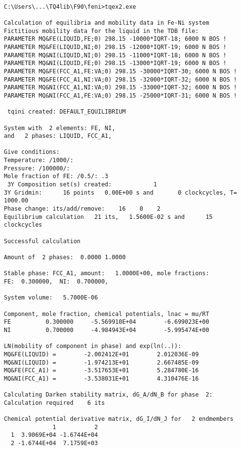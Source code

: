 \documentclass[12pt]{article}
\begin{document}
{\small
\begin{verbatim}

C:\Users\...\TQ4lib\F90\feni>tqex2.exe

Calculation of equilibria and mobility data in Fe-Ni system
Fictitious mobility data for the liquid in the TDB file:
PARAMETER MQ&FE(LIQUID,FE;0) 298.15 -10000*IQRT-18; 6000 N BOS !
PARAMETER MQ&FE(LIQUID,NI;0) 298.15 -12000*IQRT-19; 6000 N BOS !
PARAMETER MQ&NI(LIQUID,NI;0) 298.15 -11000*IQRT-18; 6000 N BOS !
PARAMETER MQ&NI(LIQUID,FE;0) 298.15 -13000*IQRT-19; 6000 N BOS !
PARAMETER MQ&FE(FCC_A1,FE:VA;0) 298.15 -30000*IQRT-30; 6000 N BOS !
PARAMETER MQ&FE(FCC_A1,NI:VA;0) 298.15 -32000*IQRT-32; 6000 N BOS !
PARAMETER MQ&NI(FCC_A1,NI:VA;0) 298.15 -33000*IQRT-32; 6000 N BOS !
PARAMETER MQ&NI(FCC_A1,FE:VA;0) 298.15 -25000*IQRT-31; 6000 N BOS !

 tqini created: DEFAULT_EQUILIBRIUM

System with  2 elements: FE, NI,
and   2 phases: LIQUID, FCC_A1,

Give conditions:
Temperature: /1000/:
Pressure: /100000/:
Mole fraction of FE: /0.5/: .3
 3Y Composition set(s) created:            1
3Y Gridmin:      16 points   0.00E+00 s and       0 clockcycles, T= 1000.00
Phase change: its/add/remove:    16    0    2
Equilibrium calculation   21 its,   1.5600E-02 s and      15 clockcycles

Successful calculation

Amount of  2 phases:  0.0000 1.0000

Stable phase: FCC_A1, amount:   1.0000E+00, mole fractions:
FE:  0.300000,  NI:  0.700000,

System volume:   5.7000E-06

Component, mole fraction, chemical potentials, lnac = mu/RT
FE          0.300000     -5.569910E+04        -6.699023E+00
NI          0.700000     -4.984943E+04        -5.995474E+00

LN(mobility of component in phase) and exp(ln(..)):
MQ&FE(LIQUID) =        -2.002412E+01        2.012036E-09
MQ&NI(LIQUID) =        -1.974213E+01        2.667485E-09
MQ&FE(FCC_A1) =        -3.517653E+01        5.284780E-16
MQ&NI(FCC_A1) =        -3.538031E+01        4.310476E-16

Calculating Darken stability matrix, dG_A/dN_B for phase  2:
Calculation required    6 its

Chemical potential derivative matrix, dG_I/dN_J for   2 endmembers
              1           2
  1  3.9069E+04 -1.6744E+04
  2 -1.6744E+04  7.1759E+03


\end{verbatim}}
\end{document}
